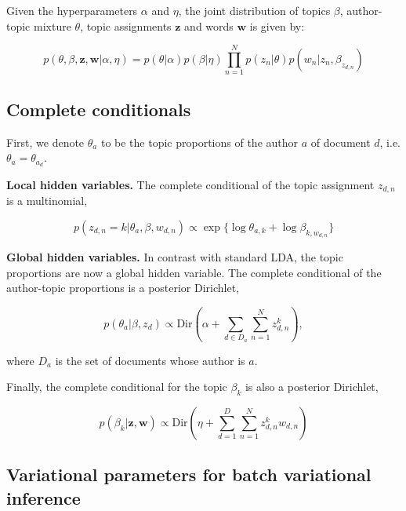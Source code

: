 \documentclass[12pt,abstracton,a4paper]{scrartcl}
\begin{document}
Given the hyperparameters $\alpha$ and $\eta$, the joint distribution of topics $\beta$, author-topic mixture $\theta$, topic assignments $\mathbf{z}$ and words $\mathbf{w}$ is given by:

\begin{equation}
p(\theta,\beta,\mathbf{z},\mathbf{w}|\alpha,\eta) = p(\theta|\alpha) p(\beta|\eta) \prod_{n=1}^{N}{p(z_n|\theta)p(w_n|z_n,\beta_{z_{d,n}})}
\end{equation}


\subsection{Complete conditionals}

First, we denote $\theta_a$ to be the topic proportions of the author $a$ of document $d$, i.e. $\theta_a = \theta_{a_d}$.

\textbf{Local hidden variables.} The complete conditional of the topic assignment $z_{d,n}$ is a multinomial,

\begin{equation}
p(z_{d,n} = k | \theta_a, \beta, w_{d,n}) \propto \exp \{ \log \theta_{a,k} + \log \beta_{k,w_{d,n}} \}
\end{equation}

\textbf{Global hidden variables.} In contrast with standard LDA, the topic proportions are now a global hidden variable.
The complete conditional of the author-topic proportions is a posterior Dirichlet,

\begin{equation}
p(\theta_a | \beta, z_{d}) \propto \text{Dir} ( \alpha + \sum_{d \in D_a}{\sum_{n=1}^{N}{z^k_{d,n}}}),
\end{equation}

\noindent where $D_a$ is the set of documents whose author is $a$.

Finally, the complete conditional for the topic $\beta_k$ is also a posterior Dirichlet,

\begin{equation}
p(\beta_k | \mathbf{z}, \mathbf{w}) \propto \text{Dir} ( \eta + \sum_{d=1}^{D}{\sum_{n=1}^{N}{z^k_{d,n}w_{d,n}}})
\end{equation}



\subsection{Variational parameters for batch variational inference}
\end{document}

